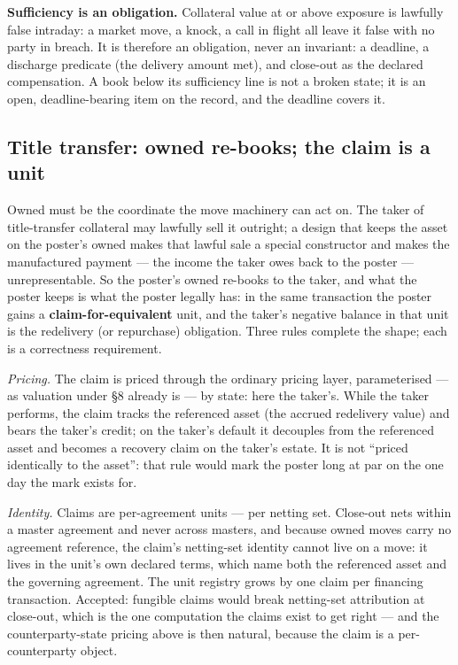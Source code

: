 \textbf{Sufficiency is an obligation.} Collateral value at or above exposure
is lawfully false intraday: a market move, a knock, a call in flight all leave
it false with no party in breach. It is therefore an obligation, never an
invariant: a deadline, a discharge predicate (the delivery amount met), and
close-out as the declared compensation. A book below its sufficiency line is
not a broken state; it is an open, deadline-bearing item on the record, and
the deadline covers it.

\subsection{Title transfer: owned re-books; the claim is a unit}

Owned must be the coordinate the move machinery can act on. The taker of
title-transfer collateral may lawfully sell it outright; a design that keeps
the asset on the poster's owned makes that lawful sale a special constructor
and makes the manufactured payment --- the income the taker owes back to the
poster --- unrepresentable. So the poster's owned re-books to the taker, and
what the poster keeps is what the poster legally has: in the same transaction
the poster gains a \textbf{claim-for-equivalent} unit, and the taker's
negative balance in that unit is the redelivery (or repurchase) obligation.
Three rules complete the shape; each is a correctness requirement.

\emph{Pricing.} The claim is priced through the ordinary pricing layer,
parameterised --- as valuation under \S8 already is --- by state: here the
taker's. While the taker performs, the claim tracks the referenced asset (the
accrued redelivery value) and bears the taker's credit; on the taker's default
it decouples from the referenced asset and becomes a recovery claim on the
taker's estate. It is not ``priced identically to the asset'': that rule would
mark the poster long at par on the one day the mark exists for.

\emph{Identity.} Claims are per-agreement units --- per netting set. Close-out
nets within a master agreement and never across masters, and because owned
moves carry no agreement reference, the claim's netting-set identity cannot
live on a move: it lives in the unit's own declared terms, which name both the
referenced asset and the governing agreement. The unit registry grows by one
claim per financing transaction. Accepted: fungible claims would break
netting-set attribution at close-out, which is the one computation the claims
exist to get right --- and the counterparty-state pricing above is then
natural, because the claim is a per-counterparty object.

